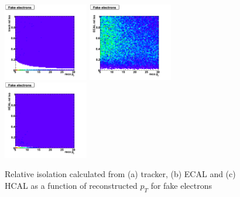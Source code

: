  \begin{figure}[htbp]
    \includegraphics[width = 0.33\textwidth]{pictures/recoPt_relIso/trackIso_elec_fake.png}
    \includegraphics[width = 0.33\textwidth]{pictures/recoPt_relIso/ecalIso_elec_fake.png}
    \includegraphics[width = 0.33\textwidth]{pictures/recoPt_relIso/hcalIso_elec_fake.png}
    \caption{Relative isolation calculated from (a) tracker, (b) ECAL and (c) HCAL as a function of
       reconstructed $p_{T}$ for fake electrons}
    \label{fig:FakeElecRecoPt_RelIso}
 \end{figure}

 \clearpage

